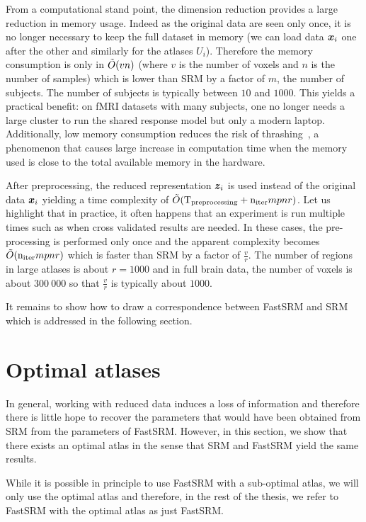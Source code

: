 From a computational stand point, the dimension reduction provides
a large reduction in memory usage. Indeed as the original data are seen only
once, it is no longer necessary to keep the full dataset in memory (we can load
data $\boldsymbol{x}_i$ one after the other and similarly for the atlases $U_i$). Therefore
the memory consumption is only in $\tilde{O}(vn)$ (where $v$ is the number of voxels
and $n$ is the number of samples) which is lower than SRM by a factor of $m$,
the number of subjects. The number of subjects is typically between $10$ and
$1000$. This yields a practical benefit: on fMRI datasets with many subjects, one no longer needs a large cluster to run the shared response model but only a modern laptop.
Additionally, low memory consumption reduces the
risk of thrashing~\cite{denning1968thrashing}, a phenomenon that causes large
increase in computation time when the memory used is close to the total available
memory in the hardware.

After preprocessing, the reduced representation $\boldsymbol{z}_i$ is used instead of the
original data $\boldsymbol{x}_i$ yielding a time complexity of $\tilde{O}(
\mathrm{T_{preprocessing}} + \mathrm{n_{iter}} mpnr)$.
Let us highlight that in practice, it often happens that an experiment is run
multiple times such as when cross validated results are needed. In these cases,
the pre-processing is performed only once and the apparent complexity becomes
$\tilde{O}(\mathrm{n_{iter}} mpnr)$ which is faster than SRM by
a factor of $\frac{v}{r}$. The number of regions in large atlases is about $r=1000$ and in full brain data, the number of voxels is about $300~000$ so that $\frac{v}{r}$ is typically about $1000$.

It remains to show how to draw a correspondence between FastSRM and SRM which is addressed in the following section.

\section{Optimal atlases}
In general, working with reduced data induces a loss of information and
therefore there is little hope to recover the parameters that would have been obtained from SRM from the parameters of FastSRM.
However, in this section, we show that there exists an optimal atlas in the sense that SRM and FastSRM yield the same results.

While it is possible in principle to use FastSRM with a sub-optimal atlas,
we will only use the optimal atlas and therefore, in the rest of the thesis, we refer to FastSRM with the optimal atlas as just FastSRM.


